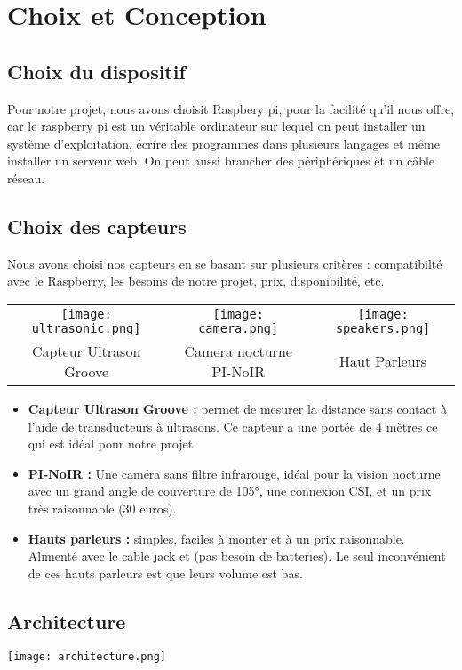 \section{Choix et Conception}
    
    \subsection{Choix du dispositif}
    
        Pour notre projet, nous avons choisit Raspbery pi, pour la facilité qu'il nous offre, car le raspberry pi est un véritable ordinateur sur lequel on peut installer un système d'exploitation, écrire des programmes dans plusieurs langages et même installer un serveur web. On peut aussi brancher des périphériques et un câble réseau.

    \subsection{Choix des capteurs}
    
        Nous avons choisi nos capteurs en se basant sur plusieurs critères : compatibilté avec le Raspberry, les besoins de notre projet, prix, disponibilité, etc.
        
        \begin{center}
        \begin{tabular}{ c c c }
         \texttt{[image: ultrasonic.png]} & \texttt{[image: camera.png]} & \texttt{[image: speakers.png]} \\ 
         Capteur Ultrason Groove & Camera nocturne PI-NoIR & Haut Parleurs \\   
        \end{tabular}
        \end{center}
        
        \begin{itemize}
            \item \textbf{Capteur Ultrason Groove : }permet de mesurer la distance sans contact à l'aide de transducteurs à ultrasons. Ce capteur a une portée de 4 mètres ce qui est idéal pour notre projet.
            \item \textbf{PI-NoIR : }Une caméra sans filtre infrarouge, idéal pour la vision nocturne avec un grand angle de couverture de 105°, une connexion CSI, et un prix très raisonnable (30 euros).
            \item \textbf{Hauts parleurs : } simples, faciles à monter et à un prix raisonnable. Alimenté avec le cable jack et (pas besoin de batteries). Le seul inconvénient de ces hauts parleurs est que leurs volume est bas.
        \end{itemize}
        
    \subsection{Architecture}
    \texttt{[image: architecture.png]}
